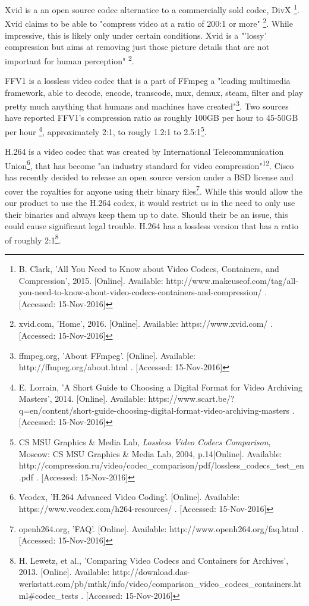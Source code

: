 \documentclass[letterpaper,10pt,onecolumn,draftclsnofoot]{IEEEtran}
\begin{document}
Xvid is a an open source codec alternatice to a commercially sold codec, DivX \footnote{B. Clark, 'All You Need to Know about Video Codecs, Containers, and Compression', 2015. [Online]. Available: http://www.makeuseof.com/tag/all-you-need-to-know-about-video-codecs-containers-and-compression/ . [Accessed: 15-Nov-2016] }. %
Xvid claims to be able to "compress video at a ratio of 200:1 or more" \footnote{xvid.com, 'Home', 2016. [Online]. Available: https://www.xvid.com/ . [Accessed: 15-Nov-2016] }. %
While impressive, this is likely only under certain conditions.
Xvid is a "'lossy' compression but aims at removing just those picture details that are not important for human perception" \textsuperscript{2}. %

FFV1 is a lossless video codec that is a part of FFmpeg a "leading multimedia framework, able to decode, encode, transcode, mux, demux, steam, filter and play pretty much anything that humans and machines have created"\footnote{ffmpeg.org, 'About FFmpeg'. [Online]. Available: http://ffmpeg.org/about.html . [Accessed: 15-Nov-2016] }. %
Two sources have reported FFV1's compression ratio as roughly 100GB per hour to 45-50GB per hour \footnote{E. Lorrain, 'A Short Guide to Choosing a Digital Format for Video Archiving Masters', 2014. [Online]. Available: https://www.scart.be/?q=en/content/short-guide-choosing-digital-format-video-archiving-masters . [Accessed: 15-Nov-2016] }, approximately 2:1, to rougly 1.2:1 to 2.5:1\footnote{CS MSU Graphics \& Media Lab, \textit{Lossless Video Codecs Comparison}, Moscow: CS MSU Graphics \& Media Lab, 2004, p.14[Online]. Available: http://compression.ru/video/codec\_comparison/pdf/lossless\_codecs\_test\_en.pdf . [Accessed: 15-Nov-2016] }. %

H.264 is a video codec that was created by International Telecommunication Union\footnote{Vcodex, 'H.264 Advanced Video Coding'. [Online]. Available: https://www.vcodex.com/h264-resources/ . [Accessed: 15-Nov-2016] }, that has become "an industry standard for video compression"\textsuperscript{12}. %
Cisco has recently decided to release an open source version under a BSD license and cover the royalties for anyone using their binary files\footnote{openh264.org, 'FAQ'. [Online]. Available: http://www.openh264.org/faq.html . [Accessed: 15-Nov-2016] }. %
While this would allow the our product to use the H.264 codex, it would restrict us in the need to only use their binaries and always keep them up to date.
Should their be an issue, this could cause significant legal trouble.
H.264 has a lossless version that has a ratio of roughly 2:1\footnote{H. Lewetz, et al., 'Comparing Video Codecs and Containers for Archives', 2013. [Online]. Available: http://download.das-werkstatt.com/pb/mthk/info/video/comparison\_video\_codecs\_containers.html\#codec\_tests . [Accessed: 15-Nov-2016] }. %
\end{document}
